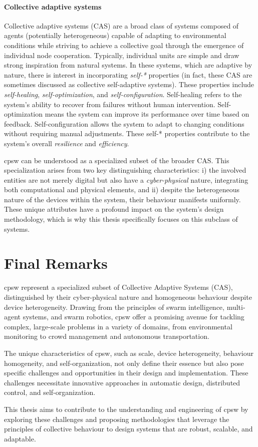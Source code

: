 \paragraph*{Collective adaptive systems}
Collective adaptive systems (CAS) are a broad class of systems composed of agents 
 (potentially heterogeneous) capable of adapting to environmental conditions 
 while striving to achieve a collective goal through the emergence of individual node cooperation. 
%
Typically, individual units are simple and draw strong inspiration from natural systems. 
 In these systems, which are adaptive by nature, 
 there is interest in incorporating \emph{self-*} properties (in fact, these CAS are sometimes discussed as collective self-adaptive systems). 
%
These properties include \emph{self-healing}, \emph{self-optimization}, and \emph{self-configuration}. 
Self-healing refers to the system's ability to recover from failures without human intervention. 
Self-optimization means the system can improve its performance over time based on feedback. Self-configuration allows the system to adapt to changing conditions without requiring manual adjustments. 
These self-* properties contribute to the system's overall \emph{resilience} and \emph{efficiency}.

\ac{cpsw} can be understood as a specialized subset of the broader CAS.
This specialization arises from two key distinguishing characteristics:
i) the involved entities are not merely digital but also have a \emph{cyber-physical} nature,
 integrating both computational and physical elements, and
ii) despite the heterogeneous nature of the devices within the system, 
 their behaviour manifests uniformly.
These unique attributes have a profound impact on the system's design methodology, 
 which is why this thesis specifically focuses on this subclass of systems.
%

\section{Final Remarks}
\Acf{cpsw} represent a specialized subset of Collective Adaptive Systems (CAS), 
 distinguished by their cyber-physical nature and homogeneous behaviour despite device heterogeneity. 
 Drawing from the principles of swarm intelligence, multi-agent systems, and swarm robotics, 
 \ac{cpsw} offer a promising avenue for tackling complex, large-scale problems in a variety of domains, from environmental monitoring to crowd management and autonomous transportation.

The unique characteristics of \ac{cpsw}, such as scale, 
device heterogeneity, behaviour homogeneity, and self-organization, 
 not only define their essence but also pose specific challenges and opportunities in their design and implementation. 
 These challenges necessitate innovative approaches in automatic design,
 distributed control, and self-organization.

This thesis aims to contribute to the understanding and engineering of \ac{cpsw} by exploring these challenges and proposing methodologies that leverage the principles of collective behaviour to design systems that are robust, scalable, and adaptable. 
